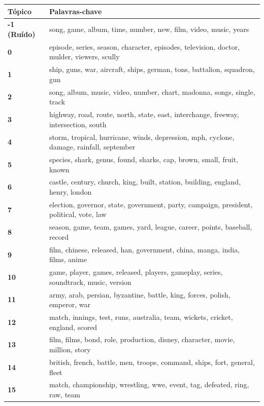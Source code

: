 \begin{table}[htpb]
    \centering
    \scriptsize
    \begin{tabularx}{\textwidth}{@{}l X@{}}
        \toprule
        \textbf{Tópico} & \textbf{Palavras-chave} \\
        \midrule
        \textbf{-1 (Ruído)} & song, game, album, time, number, new, film, video, music, years \\
        \textbf{0} & episode, series, season, character, episodes, television, doctor, mulder, viewers, scully \\
        \textbf{1} & ship, guns, war, aircraft, ships, german, tons, battalion, squadron, gun \\
        \textbf{2} & song, album, music, video, number, chart, madonna, songs, single, track \\
        \textbf{3} & highway, road, route, north, state, east, interchange, freeway, intersection, south \\
        \textbf{4} & storm, tropical, hurricane, winds, depression, mph, cyclone, damage, rainfall, september \\
        \textbf{5} & species, shark, genus, found, sharks, cap, brown, small, fruit, known \\
        \textbf{6} & castle, century, church, king, built, station, building, england, henry, london \\
        \textbf{7} & election, governor, state, government, party, campaign, president, political, vote, law \\
        \textbf{8} & season, game, team, games, yard, league, career, points, baseball, record \\
        \textbf{9} & film, chinese, released, han, government, china, manga, india, films, anime \\
        \textbf{10} & game, player, games, released, players, gameplay, series, soundtrack, music, version \\
        \textbf{11} & army, arab, persian, byzantine, battle, king, forces, polish, emperor, war \\
        \textbf{12} & match, innings, test, runs, australia, team, wickets, cricket, england, scored \\
        \textbf{13} & film, films, bond, role, production, disney, character, movie, million, story \\
        \textbf{14} & british, french, battle, men, troops, command, ships, fort, general, fleet \\
        \textbf{15} & match, championship, wrestling, wwe, event, tag, defeated, ring, raw, team \\

\end{tabularx}
\end{table}
